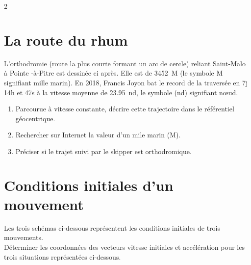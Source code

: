 \documentclass[a4paper,11pt,fleqn]{article}%
\begin{document}
\maketitle

\begin{multicols}{2}
\section{La route du rhum}
L'orthodromie (route la plus courte formant un arc de cercle) reliant Saint-Malo à Pointe -à-Pitre est dessinée ci après. Elle est de \SI{3452}{M} (le symbole M signifiant mille marin). En 2018, Francis Joyon bat le record de la traversée en 7j 14h et 47s à la vitesse moyenne de \SI{23,95}{nd}, le symbole (nd) signifiant n\oe ud.
\begin{enumerate}
	\item Parcourue à vitesse constante, décrire cette trajectoire dans le référentiel géocentrique.
	\item Rechercher sur Internet la valeur d'un mile marin (M).
	\item Préciser si le trajet suivi par le skipper est orthodromique.
\end{enumerate}

\section{Conditions initiales d'un mouvement}
Les trois schémas ci-dessous représentent les conditions initiales de trois mouvements.\\
Déterminer les coordonnées des vecteurs vitesse initiales et accélération pour les trois situations représentées ci-dessous.

\end{multicols}
\end{document}
